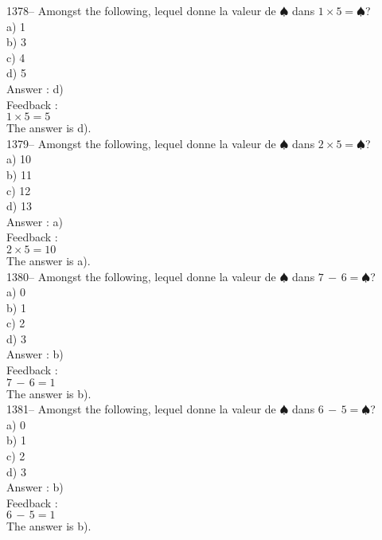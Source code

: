 \documentclass[letterpaper, 12pt]{article}
\begin{document}
1378-- Amongst the following, lequel donne la valeur de
$\spadesuit$ dans $1\times5=\spadesuit$?\\
a) 1\\
b) 3\\
c) 4\\
d) 5\\

Answer : d)\\

Feedback : \\
$1\times5=5$\\
The answer is d).\\

1379-- Amongst the following, lequel donne la valeur de
$\spadesuit$ dans $2\times5=\spadesuit$?\\
a) 10\\
b) 11\\
c) 12\\
d) 13\\

Answer : a)\\

Feedback : \\
$2\times5=10$\\
The answer is a).\\

1380-- Amongst the following, lequel donne la valeur de
$\spadesuit$ dans $7\,-\,6=\spadesuit$?\\
a) 0\\
b) 1\\
c) 2\\
d) 3\\

Answer : b)\\

Feedback : \\
$7\,-\,6=1$\\
The answer is b).\\

1381-- Amongst the following, lequel donne la valeur de
$\spadesuit$ dans $6\,-\,5=\spadesuit$?\\
a) 0\\
b) 1\\
c) 2\\
d) 3\\

Answer : b)\\

Feedback : \\
$6\,-\,5=1$\\
The answer is b).\\
\end{document}
